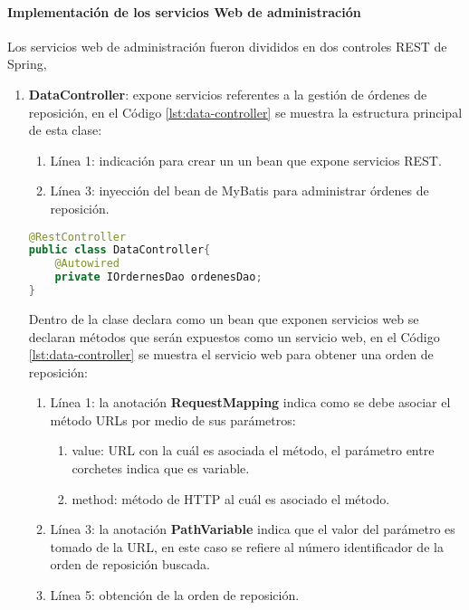 \paragraph{Implementación de los servicios Web de administración\\}
Los servicios web de administración fueron divididos en dos controles REST de Spring, 
\begin{enumerate}
	\item \textbf{DataController}: expone servicios referentes a la gestión de órdenes de reposición, en el Código \ref{lst:data-controller} se muestra la estructura principal de esta clase:
	\begin{enumerate}
		\item Línea 1: indicación para crear un un bean que expone servicios REST.
		\item Línea 3: inyección del bean de MyBatis para administrar órdenes de reposición.
	\end{enumerate}

\begin{lstlisting}[language=Java, caption={Controlador para exponer servicios Web de órdenes de reposición.}, captionpos=b, label={lst:data-controller}]
@RestController
public class DataController{
	@Autowired
	private IOrdernesDao ordenesDao;
}
\end{lstlisting}

	Dentro de la clase declara como un bean que exponen servicios web se declaran métodos que serán expuestos como un servicio web, en el Código \ref{lst:data-controller} se muestra el servicio web para obtener una orden de reposición:
	\begin{enumerate}
		\item Línea 1: la anotación \textbf{RequestMapping} indica como se debe asociar el método URLs por medio de sus parámetros:
		\begin{enumerate}
			\item value: URL con la cuál es asociada el método, el parámetro entre corchetes indica que es variable.
			\item method: método de HTTP al cuál es asociado el método. 
		\end{enumerate}
		\item Línea 3: la anotación \textbf{PathVariable} indica que el valor del parámetro es tomado de la URL, en este caso se refiere al número identificador de la orden de reposición buscada.
		\item Línea 5: obtención de la orden de reposición.
	\end{enumerate}


\end{enumerate}
